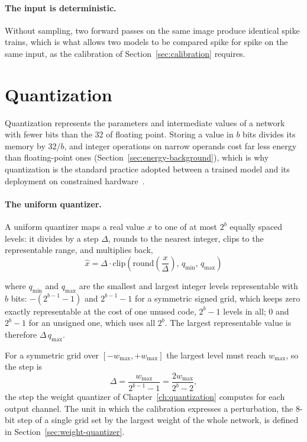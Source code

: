 \paragraph{The input is deterministic.} Without sampling, two forward passes on
the same image produce identical spike trains, which is what allows two models to
be compared spike for spike on the same input, as the calibration of
Section~\ref{sec:calibration} requires.

\section{Quantization}
\label{sec:quantization-background}

Quantization represents the parameters and intermediate values of a network with
fewer bits than the 32 of floating point. Storing a value in $b$ bits divides its
memory by $32/b$, and integer operations on narrow operands cost far less energy
than floating-point ones (Section~\ref{sec:energy-background}), which is why
quantization is the standard practice adopted between a trained model and its deployment on
constrained hardware~\cite{jacob2018quantization, nagel2021whitepaper}.

\paragraph{The uniform quantizer.} A uniform quantizer maps a real value $x$ to
one of at most $2^b$ equally spaced levels: it divides by a step $\Delta$, rounds to the
nearest integer, clips to the representable range, and multiplies back,
\begin{equation}
\hat{x} = \Delta \cdot \mathrm{clip}\!\left(\mathrm{round}\!\left(\frac{x}{\Delta}\right),
\, q_{\min},\, q_{\max}\right)
\label{eq:quantizer}
\end{equation}

where $q_{\min}$ and $q_{\max}$ are the smallest and largest integer levels
representable with $b$ bits: $-(2^{b-1}-1)$ and $2^{b-1}-1$ for a symmetric
signed grid, which keeps zero exactly representable at the cost of one unused
code, $2^b - 1$ levels in all; $0$ and $2^b - 1$ for an unsigned one, which uses
all $2^b$. The largest representable value is therefore $\Delta\, q_{\max}$.

For a symmetric grid over $[-w_{\max}, +w_{\max}]$ the largest level must reach
$w_{\max}$, so the step is
\begin{equation}
\Delta = \frac{w_{\max}}{2^{b-1} - 1} = \frac{2 w_{\max}}{2^b - 2},
\label{eq:step}
\end{equation}
the step the weight quantizer of Chapter~\ref{ch:quantization} computes for each
output channel. The unit in which the calibration expresses a perturbation, the
8-bit step of a single grid set by the largest weight of the whole network, is
defined in Section~\ref{sec:weight-quantizer}.

